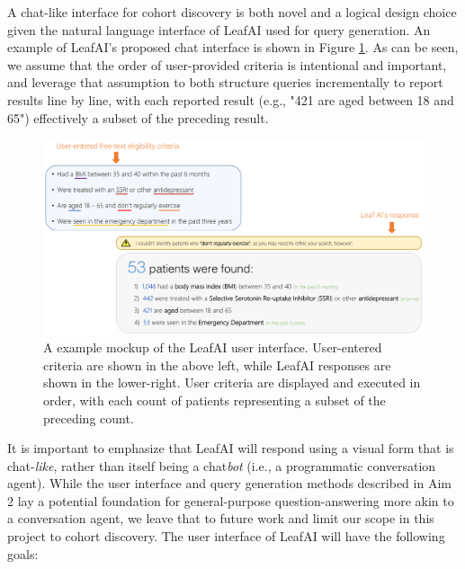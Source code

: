 \documentclass[../main.tex]{subfiles}
\begin{document}
A chat-like interface for cohort discovery is both novel and a logical design choice given the natural language interface of LeafAI used for query generation. An example of LeafAI's proposed chat interface is shown in Figure \ref{fig_leafai_demo}. As can be seen, we assume that the order of user-provided criteria is intentional and important, and leverage that assumption to both structure queries incrementally to report results line by line, with each reported result (e.g., "421 are aged between 18 and 65") effectively a subset of the preceding result.

\begin{figure}[h!]
  \includegraphics[scale=0.58]{Figures/8_future_work/leafai_demo.pdf}  
  \caption{A example mockup of the LeafAI user interface. User-entered criteria are shown in the above left, while LeafAI responses are shown in the lower-right. User criteria are displayed and executed in order, with each count of patients representing a subset of the preceding count.}
\label{fig_leafai_demo}
\end{figure}

It is important to emphasize that LeafAI will respond using a visual form that is chat-\textit{like}, rather than itself being a chat\textit{bot} (i.e., a programmatic conversation agent). While the user interface and query generation methods described in Aim 2 lay a potential foundation for general-purpose question-answering more akin to a conversation agent, we leave that to future work and limit our scope in this project to cohort discovery. The user interface of LeafAI will have the following goals:
\end{document}
